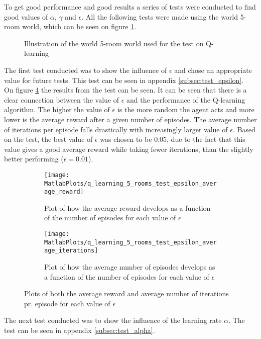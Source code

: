 \documentclass[../Head/Main.tex]{subfiles}
\begin{document}
To get good performance and good results a series of tests were conducted to find good values of $\alpha$, $\gamma$ and $\epsilon$. All the following tests were made using the world 5-room world, which can be seen on figure \ref{fig:5-room_world_impl}.
\begin{figure}[H]
	\centering
	
	\caption{Illustration of the world 5-room world used for the test on Q-learning}
	\label{fig:5-room_world_impl}
\end{figure}
The first test conducted was to show the influence of $\epsilon$ and chose an appropriate value for future tests. This test can be seen in appendix \ref{subsec:test_epsilon}.\\
On figure \ref{fig:q-learn_epsilon_impl} the results from the test can be seen. It can be seen that there is a clear connection between the value of $\epsilon$ and the performance of the Q-learning algorithm. The higher the value of $\epsilon$ is the more random the agent acts and more lower is the average reward after a given number of episodes. The average number of iterations per episode falls drastically with increasingly larger value of $\epsilon$. Based on the test, the best value of $\epsilon$ was chosen to be 0.05, due to the fact that this value gives a good average reward while taking fewer iterations, than the slightly better performing ($\epsilon=0.01$). 
\begin{figure}[H]
	\centering
	\begin{subfigure}[b]{0.49\textwidth}
		\centering
		\texttt{[image: MatlabPlots/q\_learning\_5\_rooms\_test\_epsilon\_average\_reward]}
		\caption{Plot of how the average reward develops as a function of the number of episodes for each value of $\epsilon$}
		\label{fig:q-learn_epsilon_reward_impl}
	\end{subfigure}
	\hfill
	\begin{subfigure}[b]{0.49\textwidth}
		\centering
		\texttt{[image: MatlabPlots/q\_learning\_5\_rooms\_test\_epsilon\_average\_iterations]}
		\caption{Plot of how the average number of episodes develops as a function of the number of episodes for each value of $\epsilon$}
		\label{fig:q-learn_epsilon_iterations_impl}
	\end{subfigure}
	\caption{Plots of both the average reward and average number of iterations pr. episode for each value of $\epsilon$}
	\label{fig:q-learn_epsilon_impl}
\end{figure}
The next test conducted was to show the influence of the learning rate $\alpha$. The test can be seen in appendix \ref{subsec:test_alpha}.\\
\end{document}
